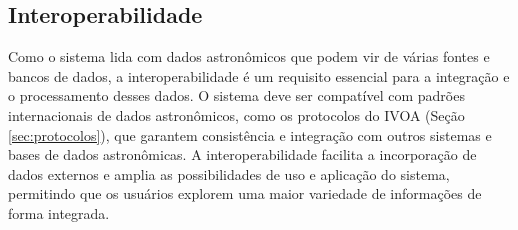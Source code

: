 




\subsection{Interoperabilidade}
\label{sec:req-inter}

Como o sistema lida com dados astronômicos que podem vir de várias fontes e bancos de dados, a interoperabilidade é um requisito essencial para a integração e o processamento desses dados. O sistema deve ser compatível com padrões internacionais de dados astronômicos, como os protocolos do IVOA (Seção \ref{sec:protocolos}), que garantem consistência e integração com outros sistemas e bases de dados astronômicas. A interoperabilidade facilita a incorporação de dados externos e amplia as possibilidades de uso e aplicação do sistema, permitindo que os usuários explorem uma maior variedade de informações de forma integrada.







